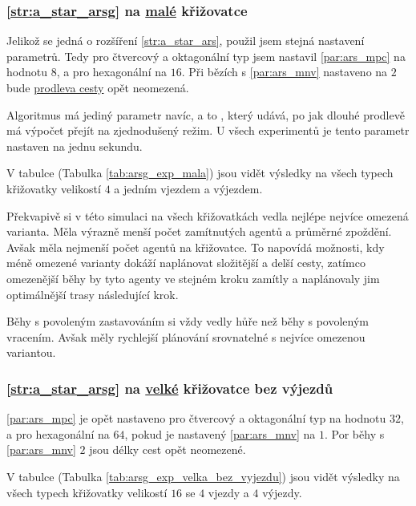 \subsubsection{\ref{str:a_star_arsg} na \hyperref[par:data_mala]{malé} křižovatce}
\label{subsubsec:exp_arsg_mala_krizovatka}

Jelikož se jedná o rozšíření \ref{str:a_star_ars}, použil jsem stejná nastavení parametrů.
Tedy pro čtvercový a oktagonální typ jsem nastavil \ref{par:ars_mpc} na hodnotu $8$, a pro hexagonální na $16$.
Při bězích s \ref{par:ars_mnv} nastaveno na $2$ bude \hyperref[par:ars_mpc]{prodleva cesty} opět neomezená.

Algoritmus má jediný parametr navíc, a to , který udává,
po jak dlouhé prodlevě má výpočet přejít na zjednodušený režim.
U všech experimentů je tento parametr nastaven na jednu sekundu.



V tabulce (Tabulka \ref{tab:arsg_exp_mala}) jsou vidět výsledky na všech typech křižovatky
velikostí $4$ a jedním vjezdem a výjezdem.

Překvapivě si v této simulaci na všech křižovatkách vedla nejlépe nejvíce omezená varianta.
Měla výrazně menší počet zamítnutých agentů a průměrné zpoždění.
Avšak měla nejmenší počet agentů na křižovatce.
To napovídá možnosti, kdy méně omezené varianty dokáží naplánovat složitější a delší cesty,
zatímco omezenější běhy by tyto agenty ve stejném kroku zamítly a naplánovaly jim optimálnější trasy následující krok.

Běhy s povoleným zastavováním si vždy vedly hůře než běhy s povoleným vracením.
Avšak měly rychlejší plánování srovnatelné s nejvíce omezenou variantou.

\subsubsection{\ref{str:a_star_arsg} na \hyperref[par:data_velka]{velké} křižovatce bez výjezdů}
\label{subsubsec:exp_arsg_velka_krizovatka_bez_vyjezdu}

\ref{par:ars_mpc} je opět nastaveno pro čtvercový a oktagonální typ na hodnotu $32$,
a pro hexagonální na $64$, pokud je nastavený \ref{par:ars_mnv} na $1$.
Por běhy s \ref{par:ars_mnv} $2$ jsou délky cest opět neomezené.



V tabulce (Tabulka \ref{tab:arsg_exp_velka_bez_vyjezdu}) jsou vidět výsledky na všech typech křižovatky
velikostí $16$ se $4$ vjezdy a $4$ výjezdy.


